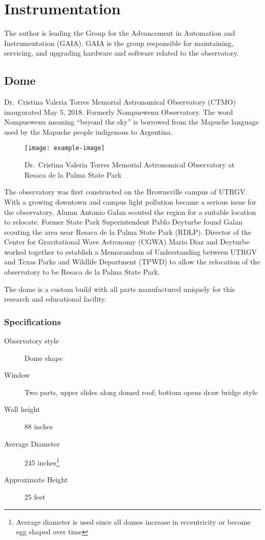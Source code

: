 \chapter{Instrumentation}
The author is leading the Group for the Advancement in Automation and Instrumentation (GAIA).
GAIA is the group responsible for maintaining, servicing, and upgrading hardware and software related to the observatory.

\section{Dome}
Dr.\ Cristina Valeria Torres Memorial Astronomical Observatory (CTMO) inaugurated May 5, 2018. 
Formerly Nompuewenu Observatory.
The word Nompuewenu meaning ``beyond the sky'' is borrowed from the Mapuche language used by the Mapuche people indigenous to Argentina.

\begin{figure}[h]
    \centering
    \texttt{[image: example-image]}
\caption{Dr.\ Cristina Valeria Torres Memorial Astronomical Observatory at Resaca de la Palma State Park}
\label{fig:CTMO}
\end{figure}

The observatory was first constructed on the Brownsville campus of UTRGV\@.
With a growing downtown and campus light pollution became a serious issue for the observatory.
Alumn Antonio Galan scouted the region for a suitable location to relocate.
Former State Park Superintendent Pablo Deyturbe found Galan scouting the area near Resaca de la Palma State Park (RDLP).
Director of the Center for Gravitational Wave Astronomy (CGWA) Mario Diaz and Deyturbe worked together to establish  
a Memorandum of Understanding between UTRGV and Texas Parks and Wildlife Department (TPWD) to allow the relocation
of the observatory to be Resaca de la Palma State Park.

The dome is a custom build with all parts manufactured uniquely for this research and educational facility.

\subsection{Specifications}
\begin{description}
    \item[Observatory style] Dome shape
    \item[Window] Two parts, upper slides along domed roof; bottom opens draw bridge style
    \item[Wall height] 88 inches
    \item[Average Diameter] 245 inches\footnote{Average diameter is used since all domes increase in eccentricity or become egg shaped over time}
    \item[Approximate Height] 25 feet
\end{description}

